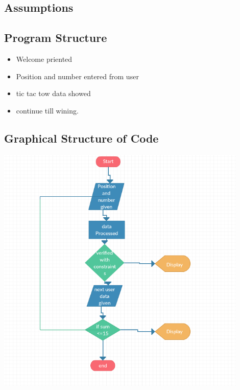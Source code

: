 \documentclass[12pt]{article}
\begin{document}
\subsection{Assumptions}


\subsection{Program Structure}
\begin{itemize}


\item Welcome priented

\item Position and number entered from user
\item tic tac tow data showed

\item continue till wining.

\end{itemize}
\subsection{Graphical Structure of Code}

\includegraphics[width=0.9\textwidth]{flowpy2.png}



 
\end{document}
